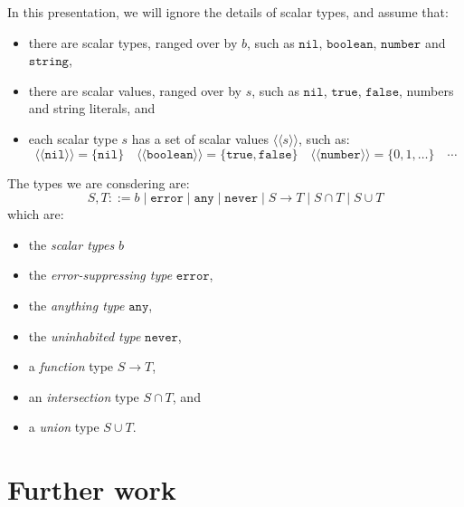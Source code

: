 \documentclass[acmsmall,review,screen]{acmart}
\newcommand{\NEVER}{\mathtt{never}}
\newcommand{\ANY}{\mathtt{any}}
\newcommand{\ERROR}{\mathtt{error}}
\newcommand{\NIL}{\mathtt{nil}}
\newcommand{\TRUE}{\mathtt{true}}
\newcommand{\FALSE}{\mathtt{false}}
\newcommand{\BOOLEAN}{\mathtt{boolean}}
\newcommand{\NUMBER}{\mathtt{number}}
\newcommand{\STRING}{\mathtt{string}}
\newcommand{\fun}{\mathbin{\rightarrow}}
\newcommand{\ssem}[1]{\langle\!\langle{#1}\rangle\!\rangle}
\begin{document}
In this presentation, we will ignore the details of scalar types,
and assume that:
\begin{itemize}

\item there are scalar types, ranged over by $b$,
  such as $\NIL$, $\BOOLEAN$, $\NUMBER$ and $\STRING$,
  
\item there are scalar values, ranged over by $s$,
  such as $\NIL$, $\TRUE$, $\FALSE$, numbers and string literals, and

\item each scalar type $s$ has a set of scalar values $\ssem{s}$, such as:
  \[
    \ssem{\NIL} = \{ \NIL \} \quad
    \ssem{\BOOLEAN} = \{ \TRUE, \FALSE \} \quad
    \ssem{\NUMBER} = \{ 0, 1, \dots \} \quad \cdots
  \]
  
\end{itemize}
The types we are consdering are:
\[
S, T ::= b \mid \ERROR \mid \ANY \mid \NEVER \mid S \fun T \mid S \cap T \mid S \cup T
\]
which are:
\begin{itemize}

\item the \emph{scalar types} $b$
  
\item the \emph{error-suppressing type} $\ERROR$,

\item the \emph{anything type} $\ANY$,

\item the \emph{uninhabited type} $\NEVER$,

\item a \emph{function} type $S \fun T$,

\item an \emph{intersection} type $S \cap T$, and

\item a \emph{union} type $S \cup T$.

\end{itemize}


\section{Further work}



\end{document}
